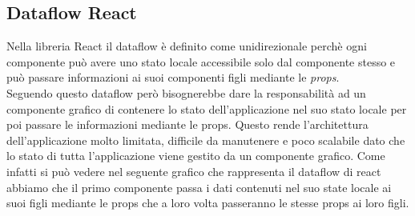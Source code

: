 \subsection{Dataflow React}
Nella libreria React il dataflow è definito come unidirezionale perchè ogni componente può avere uno stato locale accessibile solo dal componente stesso e può passare informazioni ai suoi componenti figli mediante le \textit{props}. \\
Seguendo questo dataflow però bisognerebbe dare la responsabilità ad un componente grafico di contenere lo stato dell'applicazione nel suo stato locale per poi passare le informazioni mediante le props. Questo rende l'architettura dell'applicazione molto limitata, difficile da manutenere e poco scalabile dato che lo stato di tutta l'applicazione viene gestito da un componente grafico. Come infatti si può vedere nel seguente grafico che rappresenta il dataflow di react abbiamo che il primo componente passa i dati contenuti nel suo state locale ai suoi figli mediante le props che a loro volta passeranno le stesse props ai loro figli.

\begin{minipage}{\linewidth}
\end{minipage}



